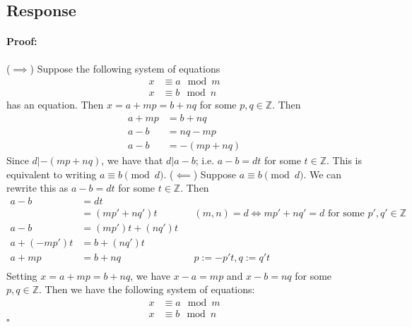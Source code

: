 \documentclass [12pt] {article}
\newcommand{\Z}{\mathbb{Z}}
\newenvironment{proof}{\paragraph{Proof:}}{\hfill$\square$}
\begin{document}
\subsection*{Response}
\begin{proof}
    ($\implies$) Suppose the following system of equations
    \begin{align*}
        x &\equiv a \mod m \\
        x &\equiv b \mod n
    \end{align*}
    has an equation. Then $x = a + mp = b + nq$ for some 
    $p, q \in \Z$. Then
    \begin{align*}
        a + mp &= b + nq \\
        a - b &= nq - mp \\
        a - b &= -(mp + nq)
    \end{align*}
    Since $d | -(mp + nq)$, we have that $d | a - b$; i.e. $a - b = dt$ for some $t \in \Z$. This is
    equivalent to writing $a \equiv b \pmod{d}$.
    \newline
    ($\impliedby$) Suppose $a \equiv b \pmod{d}$. We can rewrite this as $a - b = dt$ for some 
    $t \in \Z$. Then 
    \begin{align*}
        a - b &= dt \\
              &= (mp' + nq')t && (m, n) = d \iff mp' + nq' = d \text{ for some } p', q' \in \Z \\
        a - b &= (mp')t + (nq')t \\
        a + (-mp')t &= b + (nq')t \\
        a + mp &= b + nq && p := -p't, q := q't \\
    \end{align*}
    Setting $x = a + mp = b + nq$, we have $x - a = mp$ and $x - b = nq$ for some $p, q \in \Z$.
    Then we have the following system of equations:
    \begin{align*}
        x &\equiv a \mod m \\
        x &\equiv b \mod n
    \end{align*}
\end{proof}
\newpage
\end{document}
